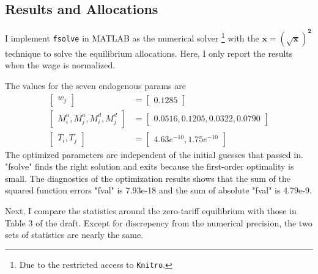 \documentclass{homeworg}
\begin{document}
\subsection{Results and Allocations}

I implement \lstinline{fsolve} in MATLAB as the numerical solver \footnote{Due to the restricted access to \lstinline{Knitro}.} with the $\boldsymbol{x} = \boldsymbol{(\sqrt{x}) ^ 2}$ technique to solve the equilibrium allocations. Here, I only report the results when the wage is normalized.

The values for the seven endogenous params are
\begin{align*}
\begin{bmatrix}
w_j
\end{bmatrix} &= \begin{bmatrix}
0.1285
\end{bmatrix} \\
\begin{bmatrix}
M^{u}_{i}, M^{u}_{j}, M^{d}_{i}, M^{d}_{j}
\end{bmatrix} &= \begin{bmatrix}
0.0516, 0.1205, 0.0322, 0.0790
\end{bmatrix} \\
\begin{bmatrix}
T_{i}, T_{j}
\end{bmatrix} &= \begin{bmatrix}
4.63e^{-10}, 1.75e^{-10}
\end{bmatrix}
\end{align*}
The optimized parameters are independent of the initial guesses that passed in. "fsolve" finds the right solution and exits because the first-order optimality is small. The diagnostics of the optimization results shows that the sum of the squared function errors "fval" is 7.93e-18 and the sum of absolute "fval" is 4.79e-9. 

Next, I compare the statistics around the zero-tariff equilibrium with those in Table 3 of the draft. Except for discrepency from the numerical precision, the two sets of statistics are nearly the same.
\end{document}
